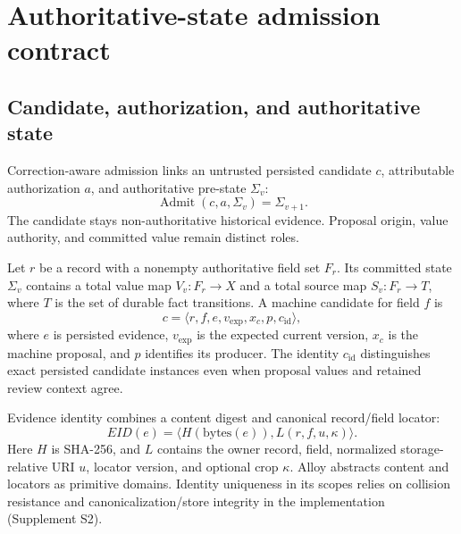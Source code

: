 \section{Authoritative-state admission contract}
\label{sec:contract}

\subsection{Candidate, authorization, and authoritative state}


Correction-aware admission links an untrusted persisted candidate $c$, attributable authorization $a$, and authoritative pre-state $\Sigma_v$:
\begin{equation}
\operatorname{Admit}(c,a,\Sigma_v)=\Sigma_{v+1}.
\label{eq:admit}
\end{equation}
The candidate stays non-authoritative historical evidence. Proposal origin, value authority, and committed value remain distinct roles.

Let $r$ be a record with a nonempty authoritative field set $F_r$. Its committed state $\Sigma_v$ contains a total value map $V_v:F_r\rightarrow X$ and a total source map $S_v:F_r\rightarrow T$, where $T$ is the set of durable fact transitions. A machine candidate for field $f$ is
\begin{equation}
c=\langle r,f,e,v_{\mathrm{exp}},x_c,p,c_{\mathrm{id}}\rangle,
\label{eq:candidate}
\end{equation}
where $e$ is persisted evidence, $v_{\mathrm{exp}}$ is the expected current version, $x_c$ is the machine proposal, and $p$ identifies its producer. The identity $c_{\mathrm{id}}$ distinguishes exact persisted candidate instances even when proposal values and retained review context agree.


Evidence identity combines a content digest and canonical record/field locator:
\begin{equation}
EID(e)=\langle H(\mathrm{bytes}(e)),L(r,f,u,\kappa)\rangle.
\label{eq:evidence}
\end{equation}
Here $H$ is SHA-256, and $L$ contains the owner record, field, normalized storage-relative URI $u$, locator version, and optional crop $\kappa$. Alloy abstracts content and locators as primitive domains. Identity uniqueness in its scopes relies on collision resistance and canonicalization/store integrity in the implementation (Supplement S2).

